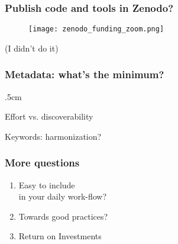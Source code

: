 \begin{frame}
\frametitle{Publish code and tools in Zenodo?}

\begin{figure}
\texttt{[image: zenodo\_funding\_zoom.png]}
\end{figure}

(I didn't do it)
\end{frame}


\begin{frame}[c]
\frametitle{Metadata: what's the minimum?}

\parskip .5cm

Effort vs. discoverability

Keywords: harmonization? 




\end{frame}


\begin{frame}

\frametitle{More questions}

\begin{enumerate}

\item Easy to include\\
in your daily work-flow?

\item Towards good practices?

\item Return on Investments  



\end{enumerate}

\end{frame}





